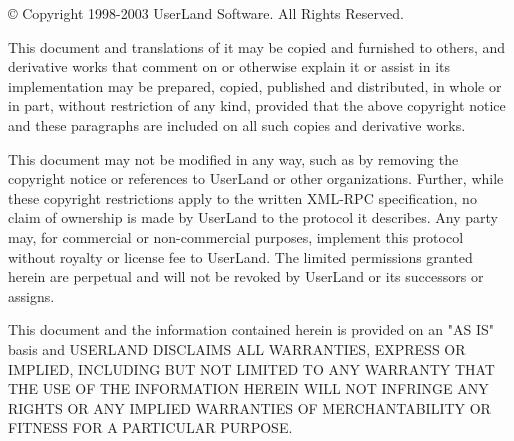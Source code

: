 {\copyright} Copyright 1998-2003 UserLand Software. All Rights Reserved.

This document and translations of it may be copied and furnished to others, and derivative works that comment on or otherwise explain it or assist in its implementation may be prepared, copied, published and distributed, in whole or in part, without restriction of any kind, provided that the above copyright notice and these paragraphs are included on all such copies and derivative works.

This document may not be modified in any way, such as by removing the copyright notice or references to UserLand or other organizations. Further, while these copyright restrictions apply to the written XML-RPC specification, no claim of ownership is made by UserLand to the protocol it describes. Any party may, for commercial or non-commercial purposes, implement this protocol without royalty or license fee to UserLand. The limited permissions granted herein are perpetual and will not be revoked by UserLand or its successors or assigns.

This document and the information contained herein is provided on an "AS IS" basis and USERLAND DISCLAIMS ALL WARRANTIES, EXPRESS OR IMPLIED, INCLUDING BUT NOT LIMITED TO ANY WARRANTY THAT THE USE OF THE INFORMATION HEREIN WILL NOT INFRINGE ANY RIGHTS OR ANY IMPLIED WARRANTIES OF MERCHANTABILITY OR FITNESS FOR A PARTICULAR PURPOSE.



